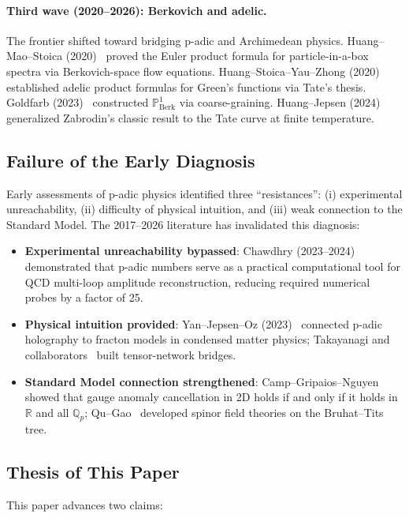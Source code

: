 \documentclass[11pt,a4paper]{article}
\newcommand{\Qp}{\mathbb{Q}_p}
\newcommand{\R}{\mathbb{R}}
\newcommand{\PoneBerk}{\mathbb{P}^1_{\mathrm{Berk}}}
\newcommand{\BirTits}{Bruhat--Tits}
\begin{document}
\paragraph{Third wave (2020--2026): Berkovich and adelic.}
The frontier shifted toward bridging p-adic and Archimedean physics. Huang--Mao--Stoica (2020)~\cite{HMS20} proved the Euler product formula for particle-in-a-box spectra via Berkovich-space flow equations. Huang--Stoica--Yau--Zhong (2020)~\cite{HSYZ20} established adelic product formulas for Green's functions via Tate's thesis. Goldfarb (2023)~\cite{G23} constructed $\PoneBerk$ via coarse-graining. Huang--Jepsen (2024)~\cite{HJ24} generalized Zabrodin's classic result to the Tate curve at finite temperature.

\subsection{Failure of the Early Diagnosis}

Early assessments of p-adic physics identified three ``resistances'': (i) experimental unreachability, (ii) difficulty of physical intuition, and (iii) weak connection to the Standard Model. The 2017--2026 literature has invalidated this diagnosis:

\begin{itemize}[leftmargin=2em]
    \item \textbf{Experimental unreachability bypassed}: Chawdhry (2023--2024)~\cite{C23,C24} demonstrated that p-adic numbers serve as a practical computational tool for QCD multi-loop amplitude reconstruction, reducing required numerical probes by a factor of 25.
    \item \textbf{Physical intuition provided}: Yan--Jepsen--Oz (2023)~\cite{YJO23} connected p-adic holography to fracton models in condensed matter physics; Takayanagi and collaborators~\cite{OT24} built tensor-network bridges.
    \item \textbf{Standard Model connection strengthened}: Camp--Gripaios--Nguyen~\cite{CGN24} showed that gauge anomaly cancellation in 2D holds if and only if it holds in $\R$ and all $\Qp$; Qu--Gao~\cite{QG20} developed spinor field theories on the \BirTits{} tree.
\end{itemize}

\subsection{Thesis of This Paper}

This paper advances two claims:
\end{document}
